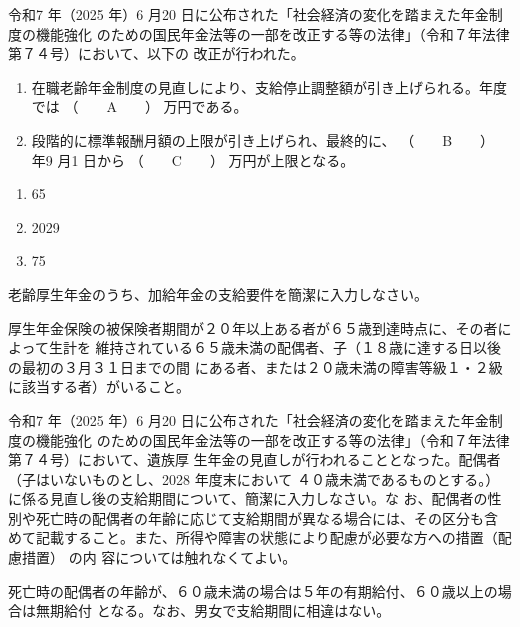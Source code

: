 \begin{fillblank}[年金1 2025 問題1(5)イ 改題]
  令和7 年（2025 年）6 月20 日に公布された「社会経済の変化を踏まえた年金制度の機能強化
のための国民年金法等の一部を改正する等の法律」（令和７年法律第７４号）において、以下の
改正が行われた。
\begin{enumerate}[(1)]
  \item 在職老齢年金制度の見直しにより、支給停止調整額が引き上げられる。\the\year 年度では
（　　A　　） 万円である。
  \item 段階的に標準報酬月額の上限が引き上げられ、最終的に、 （　　B　　） 年9 月1 日から
（　　C　　） 万円が上限となる。
\end{enumerate}

\end{fillblank}

\begin{answerbox}
 \begin{enumerate}[A: ]
  \item 65
  \item 2029
  \item 75
\end{enumerate} 
\end{answerbox}

\begin{shortanswer}[年金1 2025 問題2(3)ア]
  老齢厚生年金のうち、加給年金の支給要件を簡潔に入力しなさい。 
\end{shortanswer}

\begin{answerbox}
  厚生年金保険の被保険者期間が２０年以上ある者が６５歳到達時点に、その者によって生計を
維持されている６５歳未満の配偶者、子（１８歳に達する日以後の最初の３月３１日までの間
にある者、または２０歳未満の障害等級１・２級に該当する者）がいること。
\end{answerbox}

\begin{shortanswer}[年金1 2025 問題2(3)イ]
令和7 年（2025 年）6 月20 日に公布された「社会経済の変化を踏まえた年金制度の機能強化
のための国民年金法等の一部を改正する等の法律」（令和７年法律第７４号）において、遺族厚
生年金の見直しが行われることとなった。配偶者（子はいないものとし、2028 年度末において
４０歳未満であるものとする。）に係る見直し後の支給期間について、簡潔に入力しなさい。な
お、配偶者の性別や死亡時の配偶者の年齢に応じて支給期間が異なる場合には、その区分も含
めて記載すること。また、所得や障害の状態により配慮が必要な方への措置（配慮措置） の内
容については触れなくてよい。
\end{shortanswer}

\begin{answerbox}
  死亡時の配偶者の年齢が、６０歳未満の場合は５年の有期給付、６０歳以上の場合は無期給付
となる。なお、男女で支給期間に相違はない。
\end{answerbox}

\newpage
